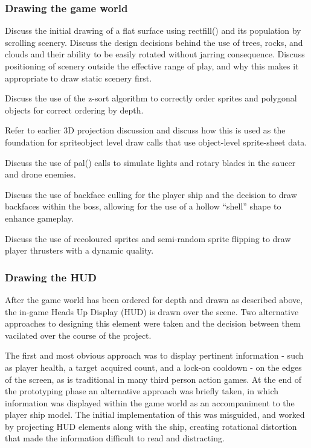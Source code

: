 \documentclass[11pt]{article}
\begin{document}
\subsubsection*{Drawing the game world}
Discuss the initial drawing of a flat surface using rectfill() and its population by scrolling scenery.
Discuss the design decisions behind the use of trees, rocks, and clouds and their ability to be easily
rotated without jarring consequence. Discuss positioning of scenery outside the effective range of
play, and why this makes it appropriate to draw static scenery first.

Discuss the use of the z-sort algorithm to correctly order sprites and polygonal objects
for correct ordering by depth. 

Refer to earlier 3D projection discussion and discuss how this is used as the foundation for
spriteobject level draw calls that use object-level sprite-sheet data.

Discuss the use of pal() calls to simulate lights and rotary blades in the saucer and drone
enemies.

Discuss the use of backface culling for the player ship and the decision to draw backfaces
within the boss, allowing for the use of a hollow ``shell'' shape to enhance gameplay.

Discuss the use of recoloured sprites and semi-random sprite flipping to draw player thrusters
with a dynamic quality.


\subsubsection*{Drawing the HUD}

After the game world has been ordered for depth and drawn as described above, the in-game Heads Up
Display (HUD) is drawn over the scene. Two alternative approaches to designing this element were
taken and the decision between them vacilated over the course of the project.

The first and most obvious approach was to display pertinent information - such as player health,
a target acquired count, and a lock-on cooldown - on the edges of the screen, as is traditional in
many third person action games. At the end of the prototyping phase an alternative approach was
briefly taken, in which information was displayed within the game world as an accompaniment to
the player ship model. The initial implementation of this was misguided, and worked by projecting
HUD elements along with the ship, creating rotational distortion that made the information difficult
to read and distracting.
\end{document}
